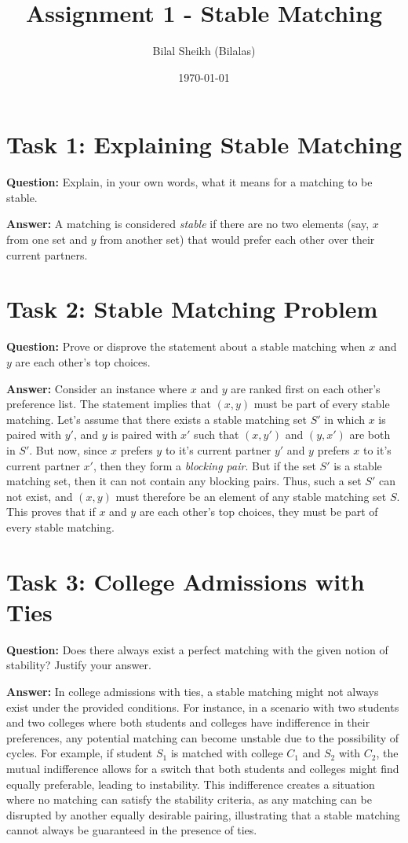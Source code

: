 \documentclass{article}
\title{Assignment 1 - Stable Matching}
\author{Bilal Sheikh (Bilalas)}
\date{\today}
\begin{document}
\maketitle

\section*{Task 1: Explaining Stable Matching}

\textbf{Question:} Explain, in your own words, what it means for a matching to be stable.

\textbf{Answer:} 
A matching is considered \textit{stable} if there are no two elements (say, $x$ from one set and $y$ from another set) that would prefer each other over their current partners. 
\section*{Task 2: Stable Matching Problem}

\textbf{Question:} Prove or disprove the statement about a stable matching when $x$ and $y$ are each other's top choices.

\textbf{Answer:} 
Consider an instance where $x$ and $y$ are ranked first on each other's preference list. The statement implies that $(x, y)$ must be part of every stable matching. 
\newline Let's assume that there exists a stable matching set $S'$ in which $x$ is paired with $y'$, and $y$ is paired with $x'$ such that $(x, y')$ and $(y, x')$ are both in $S'$.
But now, since $x$ prefers $y$ to it's current partner $y'$ and $y$ prefers $x$ to it's current partner $x'$, then they form a \textit{blocking pair}. 
But if the set $S'$ is a stable matching set, then it can not contain any blocking pairs. Thus, such a set $S'$ can not exist, and $(x,y)$ must therefore be an element of any stable matching set $S$.
This proves that if $x$ and $y$ are each other's top choices, they must be part of every stable matching. 
\section*{Task 3: College Admissions with Ties}

\textbf{Question:} Does there always exist a perfect matching with the given notion of stability? Justify your answer.

\textbf{Answer:} 
In college admissions with ties, a stable matching might not always exist under the provided conditions. 
For instance, in a scenario with two students and two colleges where both students and colleges have indifference in their preferences, any potential matching can become unstable due to the possibility of cycles. For example, if student \(S_1\) is matched with college \(C_1\) and \(S_2\) with \(C_2\), the mutual indifference allows for a switch that both students and colleges might find equally preferable, leading to instability. This indifference creates a situation where no matching can satisfy the stability criteria, as any matching can be disrupted by another equally desirable pairing, illustrating that a stable matching cannot always be guaranteed in the presence of ties.
\end{document}
